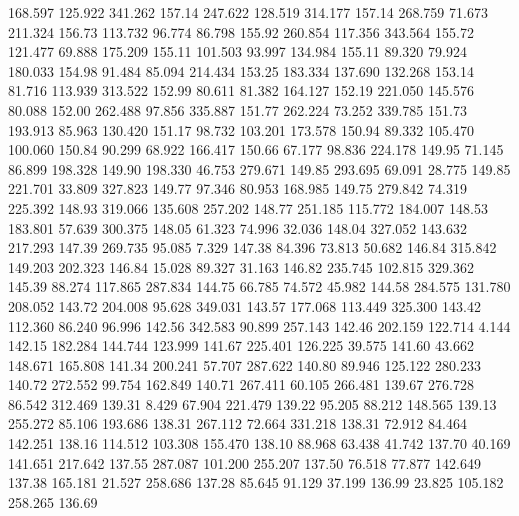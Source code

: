  168.597  125.922  341.262       157.14
 247.622  128.519  314.177       157.14
 268.759   71.673  211.324       156.73
 113.732   96.774   86.798       155.92
 260.854  117.356  343.564       155.72
 121.477   69.888  175.209       155.11
 101.503   93.997  134.984       155.11
  89.320   79.924  180.033       154.98
  91.484   85.094  214.434       153.25
 183.334  137.690  132.268       153.14
  81.716  113.939  313.522       152.99
  80.611   81.382  164.127       152.19
 221.050  145.576   80.088       152.00
 262.488   97.856  335.887       151.77
 262.224   73.252  339.785       151.73
 193.913   85.963  130.420       151.17
  98.732  103.201  173.578       150.94
  89.332  105.470  100.060       150.84
  90.299   68.922  166.417       150.66
  67.177   98.836  224.178       149.95
  71.145   86.899  198.328       149.90
 198.330   46.753  279.671       149.85
 293.695   69.091   28.775       149.85
 221.701   33.809  327.823       149.77
  97.346   80.953  168.985       149.75
 279.842   74.319  225.392       148.93
 319.066  135.608  257.202       148.77
 251.185  115.772  184.007       148.53
 183.801   57.639  300.375       148.05
  61.323   74.996   32.036       148.04
 327.052  143.632  217.293       147.39
 269.735   95.085    7.329       147.38
  84.396   73.813   50.682       146.84
 315.842  149.203  202.323       146.84
  15.028   89.327   31.163       146.82
 235.745  102.815  329.362       145.39
  88.274  117.865  287.834       144.75
  66.785   74.572   45.982       144.58
 284.575  131.780  208.052       143.72
 204.008   95.628  349.031       143.57
 177.068  113.449  325.300       143.42
 112.360   86.240   96.996       142.56
 342.583   90.899  257.143       142.46
 202.159  122.714    4.144       142.15
 182.284  144.744  123.999       141.67
 225.401  126.225   39.575       141.60
  43.662  148.671  165.808       141.34
 200.241   57.707  287.622       140.80
  89.946  125.122  280.233       140.72
 272.552   99.754  162.849       140.71
 267.411   60.105  266.481       139.67
 276.728   86.542  312.469       139.31
   8.429   67.904  221.479       139.22
  95.205   88.212  148.565       139.13
 255.272   85.106  193.686       138.31
 267.112   72.664  331.218       138.31
  72.912   84.464  142.251       138.16
 114.512  103.308  155.470       138.10
  88.968   63.438   41.742       137.70
  40.169  141.651  217.642       137.55
 287.087  101.200  255.207       137.50
  76.518   77.877  142.649       137.38
 165.181   21.527  258.686       137.28
  85.645   91.129   37.199       136.99
  23.825  105.182  258.265       136.69
